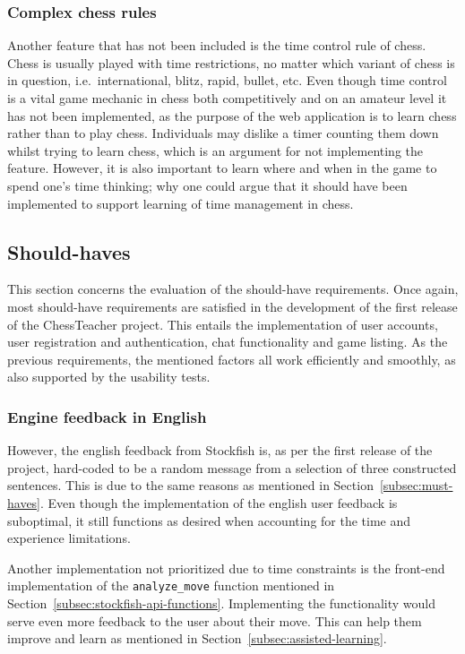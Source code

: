 
\subsubsection{Complex chess rules}

Another feature that has not been included is the time control rule of chess.
Chess is usually played with time restrictions, no matter which variant of chess is in question, i.e.\ international,
blitz, rapid, bullet, etc.
Even though time control is a vital game mechanic in chess both competitively and on an amateur level it has not been
implemented, as the purpose of the web application is to learn chess rather than to play chess.
Individuals may dislike a timer counting them down whilst trying to learn chess, which is an argument for not
implementing the feature.
However, it is also important to learn where and when in the game to spend one's time thinking; why one could argue that
it should have been implemented to support learning of time management in chess.


\subsection{Should-haves}\label{subsec:should-haves}

This section concerns the evaluation of the should-have requirements.
Once again, most should-have requirements are satisfied in the development of the first release of the ChessTeacher
project.
This entails the implementation of user accounts, user registration and authentication, chat functionality and game
listing.
As the previous requirements, the mentioned factors all work efficiently and smoothly,
as also supported by the usability tests.


\subsubsection{Engine feedback in English}

However, the english feedback from Stockfish is, as per the first release of the project, hard-coded to be a random
message from a selection of three constructed sentences.
This is due to the same reasons as mentioned in Section~\ref{subsec:must-haves}.
Even though the implementation of the english user feedback is suboptimal, it still functions as desired when accounting
for the time and experience limitations.

Another implementation not prioritized due to time constraints is the front-end implementation of the
\verb|analyze_move| function mentioned in Section~\ref{subsec:stockfish-api-functions}.
Implementing the functionality would serve even more feedback to the user about their move.
This can help them improve and learn as mentioned in Section~\ref{subsec:assisted-learning}.
